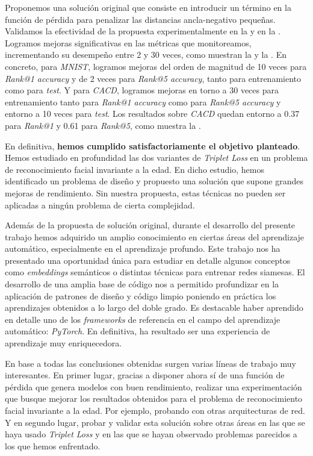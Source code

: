 Proponemos una solución original que consiste en introducir un término en la función de pérdida para penalizar las distancias ancla-negativo pequeñas. Validamos la efectividad de la propuesta experimentalmente en la  y en la . Logramos mejoras significativas en las métricas que monitoreamos, incrementando su desempeño entre 2 y 30 veces, como muestran la  y la . En concreto, para \textit{MNIST}, logramos mejoras del orden de magnitud de 10 veces para \textit{Rank@1 accuracy} y de 2 veces para \textit{Rank@5 accuracy}, tanto para entrenamiento como para \textit{test}. Y para \textit{CACD}, logramos mejoras en torno a 30 veces para entrenamiento tanto para \textit{Rank@1 accuracy} como para \textit{Rank@5 accuracy} y entorno a 10 veces para \textit{test}. Los resultados sobre \textit{CACD} quedan entorno a 0.37 para \textit{Rank@1} y 0.61 para \textit{Rank@5}, como muestra la .

En definitiva, \textbf{hemos cumplido satisfactoriamente el objetivo planteado}. Hemos estudiado en profundidad las dos variantes de \textit{Triplet Loss} en un problema de reconocimiento facial invariante a la edad. En dicho estudio, hemos identificado un problema de diseño y propuesto una solución que supone grandes mejoras de rendimiento. Sin nuestra propuesta, estas técnicas no pueden ser aplicadas a ningún problema de cierta complejidad.

Además de la propuesta de solución original, durante el desarrollo del presente trabajo hemos adquirido un amplio conocimiento en ciertas áreas del aprendizaje automático, especialmente en el aprendizaje profundo. Este trabajo nos ha presentado una oportunidad única para estudiar en detalle algunos conceptos como \textit{embeddings} semánticos o distintas técnicas para entrenar redes siamesas. El desarrollo de una amplia base de código nos a permitido profundizar en la aplicación de patrones de diseño y código limpio poniendo en práctica los aprendizajes obtenidos a lo largo del doble grado. Es destacable haber aprendido en detalle uno de los \textit{frameworks} de referencia en el campo del aprendizaje automático: \textit{PyTorch}. En definitiva, ha resultado ser una experiencia de aprendizaje muy enriquecedora.

En base a todas las conclusiones obtenidas surgen varias líneas de trabajo muy interesantes. En primer lugar, gracias a disponer ahora sí de una función de pérdida que genera modelos con buen rendimiento, realizar una experimentación que busque mejorar los resultados obtenidos para el problema de reconocimiento facial invariante a la edad. Por ejemplo, probando con otras arquitecturas de red. Y en segundo lugar, probar y validar esta solución sobre otras áreas en las que se haya usado \textit{Triplet Loss} y en las que se hayan observado problemas parecidos a los que hemos enfrentado.
